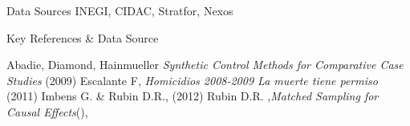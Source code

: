 \documentclass[final]{beamer}
\newlength{\sepwid}
\newlength{\onecolwid}
\begin{document}
\begin{frame}[t]
\begin{columns}[t]
\begin{column}{\onecolwid}
      \begin{block}{Data Sources}
       INEGI, CIDAC, Stratfor, Nexos
      \end{block}

      \begin{block}{Key References \& Data Source}
   
        
        \small{\begin{thebibliography}{99}
           Abadie, Diamond, Hainmueller  \emph{Synthetic Control Methods for Comparative Case Studies} (2009)
           Escalante F, \emph{Homicidios 2008-2009 La muerte tiene permiso} (2011)
           Imbens G. \& Rubin D.R., (2012)
           Rubin D.R. ,\emph{Matched Sampling for Causal Effects}(),
          \end{thebibliography}}
        
      \end{block}
    \end{column}
  \end{columns}
\end{frame}
\end{document}
